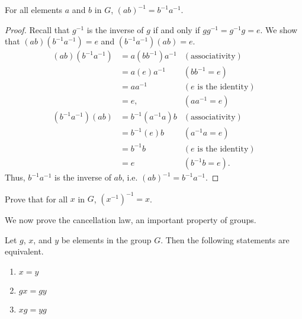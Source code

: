 \begin{theorem}
    For all elements $a$ and $b$ in $G$, $(ab)^{-1} = b^{-1}a^{-1}$.
\end{theorem}
\begin{proof}
    Recall that $g^{-1}$ is the inverse of $g$ if and only if $gg^{-1} = g^{-1}g = e$. We show that $(ab)(b^{-1}a^{-1}) = e$ and $(b^{-1}a^{-1})(ab) = e$.
    \begin{align*}
        (ab)(b^{-1}a^{-1}) &= a(bb^{-1})a^{-1} & (\text{associativity})\\
        &= a(e)a^{-1} & (bb^{-1} = e)\\
        &= aa^{-1} & (e \text{ is the identity})\\
        &= e, & (aa^{-1} = e)\\
        (b^{-1}a^{-1})(ab) &= b^{-1}(a^{-1}a)b & (\text{associativity})\\
        &= b^{-1}(e)b & (a^{-1}a = e)\\
        &= b^{-1}b & (e \text{ is the identity})\\
        &= e & ( b^{-1}b = e).
    \end{align*}
    Thus, $b^{-1}a^{-1}$ is the inverse of $ab$, i.e. $(ab)^{-1} = b^{-1}a^{-1}$.
\end{proof}

\begin{exercise}\label{exercise-inverse-of-inverse-is-element}
Prove that for all $x$ in $G$, $\left(x^{-1}\right)^{-1} = x$.
\end{exercise}

\newpage

We now prove the cancellation law, an important property of groups.
\begin{proposition}
    Let $g$, $x$, and $y$ be elements in the group $G$. Then the following statements are equivalent.
    \begin{enumerate}
        \item $x = y$
        \item $gx = gy$
        \item $xg = yg$
    \end{enumerate}
\end{proposition}

